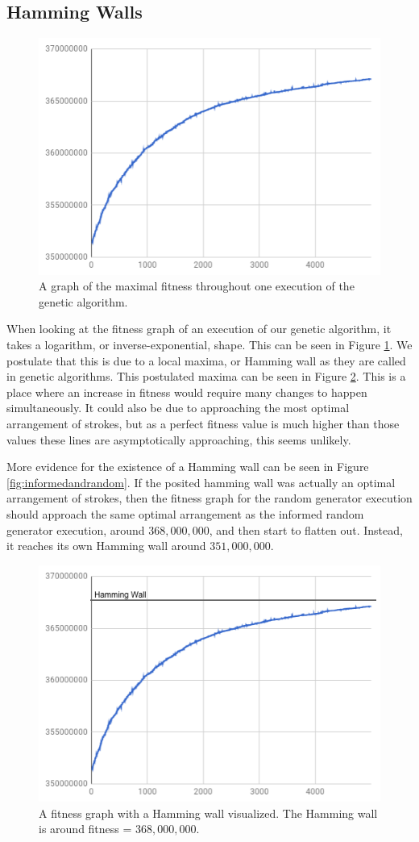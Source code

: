 \subsection{Hamming Walls}
\begin{figure}[t]
\centering
    \includegraphics[width=0.6\linewidth]{2018-04-03-203542_510x353_scrot.png}
    \caption[Maximize selector fitness graph]{A graph of the maximal fitness throughout one execution of the genetic algorithm.}
    \label{fig:fitnessgraph}
\end{figure}
When looking at the fitness graph of an execution of our genetic algorithm, it takes a logarithm, or inverse-exponential, shape. This can be seen in Figure \ref{fig:fitnessgraph}. We postulate that this is due to a local maxima, or Hamming wall as they are called in genetic algorithms. This postulated maxima can be seen in Figure \ref{fig:hamming}. This is a place where an increase in fitness would require many changes to happen simultaneously.\cite{hamming} It could also be due to approaching the most optimal arrangement of strokes, but as a perfect fitness value is much higher than those values these lines are asymptotically approaching, this seems unlikely. 

More evidence for the existence of a Hamming wall can be seen in Figure \ref{fig:informedandrandom}. If the posited hamming wall was actually an optimal arrangement of strokes, then the fitness graph for the random generator execution should approach the same optimal arrangement as the informed random generator execution, around $368,000,000$, and then start to flatten out. Instead, it reaches its own Hamming wall around $351,000,000$. 

\begin{figure}[b]
    \centering
    \includegraphics[width=0.6\linewidth]{hamming_graph.png}
    \caption[Visualized Hamming wall]{A fitness graph with a Hamming wall visualized. The Hamming wall is around fitness = $368,000,000$.}
    \label{fig:hamming}
\end{figure}

